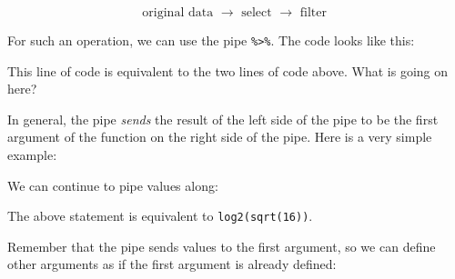 \documentclass[
]{krantz}
\newenvironment{Shaded}{\begin{snugshade}}{\end{snugshade}}
\newcommand{\CommentTok}[1]{\textcolor[rgb]{0.37,0.37,0.37}{\textit{#1}}}
\newcommand{\DataTypeTok}[1]{\textcolor[rgb]{0.27,0.27,0.27}{#1}}
\newcommand{\DecValTok}[1]{\textcolor[rgb]{0.06,0.06,0.06}{#1}}
\newcommand{\FloatTok}[1]{\textcolor[rgb]{0.06,0.06,0.06}{#1}}
\newcommand{\KeywordTok}[1]{\textcolor[rgb]{0.27,0.27,0.27}{\textbf{#1}}}
\newcommand{\NormalTok}[1]{#1}
\newcommand{\OperatorTok}[1]{\textcolor[rgb]{0.43,0.43,0.43}{\textbf{#1}}}
\newcommand{\StringTok}[1]{\textcolor[rgb]{0.5,0.5,0.5}{#1}}
\begin{document}
\[ \mbox{original data }
\rightarrow \mbox{ select }
\rightarrow \mbox{ filter } \]

For such an operation, we can use the pipe \texttt{\%\textgreater{}\%}. The code looks like this:

\begin{Shaded}
\end{Shaded}

This line of code is equivalent to the two lines of code above. What is going on here?

In general, the pipe \emph{sends} the result of the left side of the pipe to be the first argument of the function on the right side of the pipe. Here is a very simple example:

\begin{Shaded}
\end{Shaded}

We can continue to pipe values along:

\begin{Shaded}
\end{Shaded}

The above statement is equivalent to \texttt{log2(sqrt(16))}.

Remember that the pipe sends values to the first argument, so we can define other arguments as if the first argument is already defined:

\begin{Shaded}
\end{Shaded}
\end{document}
